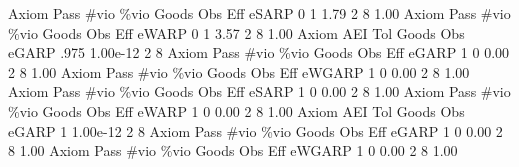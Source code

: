        Axiom {\VBAR} Pass        \#vio        \%vio       Goods         Obs         Eff  
       eSARP {\VBAR}    0           1        1.79           2           8        1.00  
{\smallskip}
{\smallskip}
{\smallskip}
       Axiom {\VBAR} Pass        \#vio        \%vio       Goods         Obs         Eff  
       eWARP {\VBAR}    0           1        3.57           2           8        1.00  
{\smallskip}
       Axiom {\VBAR}       AEI        Tol      Goods        Obs 
       eGARP {\VBAR}      .975   1.00e-12          2          8 
{\smallskip}
{\smallskip}
{\smallskip}
       Axiom {\VBAR} Pass        \#vio        \%vio       Goods         Obs         Eff  
       eGARP {\VBAR}    1           0        0.00           2           8        1.00  
{\smallskip}
{\smallskip}
{\smallskip}
       Axiom {\VBAR} Pass        \#vio        \%vio       Goods         Obs         Eff  
      eWGARP {\VBAR}    1           0        0.00           2           8        1.00  
{\smallskip}
{\smallskip}
{\smallskip}
       Axiom {\VBAR} Pass        \#vio        \%vio       Goods         Obs         Eff  
       eSARP {\VBAR}    1           0        0.00           2           8        1.00  
{\smallskip}
{\smallskip}
{\smallskip}
       Axiom {\VBAR} Pass        \#vio        \%vio       Goods         Obs         Eff  
       eWARP {\VBAR}    1           0        0.00           2           8        1.00  
{\smallskip}
       Axiom {\VBAR}       AEI        Tol      Goods        Obs 
       eGARP {\VBAR}         1   1.00e-12          2          8 
{\smallskip}
{\smallskip}
{\smallskip}
       Axiom {\VBAR} Pass        \#vio        \%vio       Goods         Obs         Eff  
       eGARP {\VBAR}    1           0        0.00           2           8        1.00  
{\smallskip}
{\smallskip}
{\smallskip}
       Axiom {\VBAR} Pass        \#vio        \%vio       Goods         Obs         Eff  
      eWGARP {\VBAR}    1           0        0.00           2           8        1.00  
